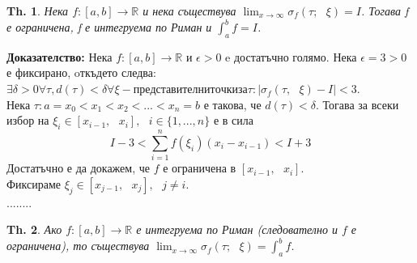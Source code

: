 \documentclass[12pt]{article}
\newtheorem{theorem}{Th.}
\newcommand{\spc}{\text{ }}
\begin{document}
	\begin{theorem}
		Нека $f: \left[a, b\right] \rightarrow \mathbb{R}$ и нека съществува  $\lim_{x\to\infty} \sigma_{f}\left(\tau;\spc\xi\right) = I$. Тогава f е ограничена, f е интегруема по Риман и $\int_{a}^{b} f = I$.
		
	\end{theorem}
	\textbf{Доказателство:} Нека $f: \left[a, b\right] \rightarrow \mathbb{R}$ и $\epsilon > 0$ e достатъчно голямо. Нека $\epsilon = 3 > 0$ е фиксирано, oткъдето следва: \\
	$\exists\delta>0\forall\tau, d(\tau)<\delta\forall\xi - представителни точки за \tau : |\sigma_{f}\left(\tau,\spc\xi\right)-I|<3$.\\
	Нека $\tau : a=x_{0}<x_{1}<x_{2}<...<x_{n}=b$ е такова, че $d(\tau)<\delta$.
	Тогава за всеки избор на $\xi_{i}\in\left[x_{i-1},\spc x_{i}\right],\spc i\in\{1,...,n\}$ е в сила\\
	\[I-3 < \sum _{i=1}^{n}f(\xi_{i})(x_{i}-x_{i-1})<I+3\]
	Достатъчно е да докажем, че $f$ е ограничена в $\left[x_{i-1},\spc x_{i}\right]$.\\
	Фиксираме $\xi_{j}\in\left[x_{j-1},\spc x_{j}\right],\spc j\neq i$.\\
	........
	
	\begin{theorem}
		Ако $f: \left[a, b\right] \rightarrow \mathbb{R}$ е интегруема по Риман (следователно и $f$ е ограничена), то съществува $\lim_{x\to\infty} \sigma_{f}\left(\tau;\spc\xi\right) = \int_{a}^{b} f$.
		
	\end{theorem}
\end{document}
